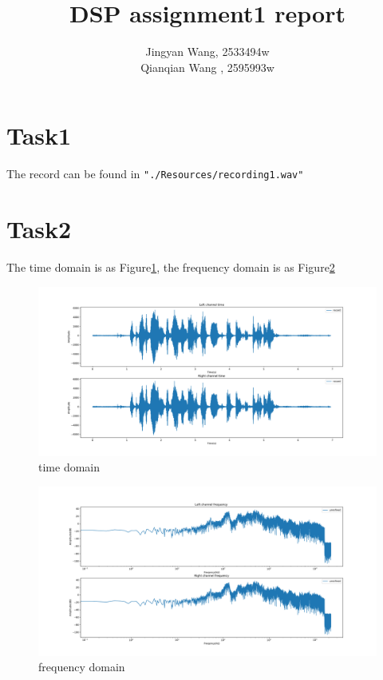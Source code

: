 \documentclass[a4paper,12pt]{article}
\begin{document}
%
   \title{\textbf{DSP assignment1 report}}

   \author{Jingyan Wang, 2533494w \\ Qianqian Wang , 2595993w}
          
   \date{}

   \maketitle
   
   \tableofcontents
 
  \newpage

\section{Task1}
The record can be found in \lstinline|"./Resources/recording1.wav"|
\section{Task2}
The time domain is as Figure\ref{fig_recordT}, the frequency domain is as Figure\ref{fig_recordF}
\begin{figure}[h]   
	\centering 
	\includegraphics[width=12cm]{../Output/Figures/recordT} 
	\caption{time domain}   
	\label{fig_recordT}
\end{figure}
\begin{figure}[h]   
	\centering 
	\includegraphics[width=12cm]{../Output/Figures/recordF} 
	\caption{frequency domain}   
	\label{fig_recordF}
\end{figure}
\end{document}
